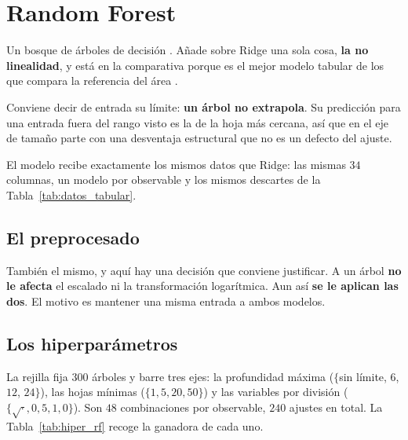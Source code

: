 \section{Random Forest}
\label{sec:sol_rf}

Un bosque de árboles de decisión \cite{breiman2001random}. Añade sobre Ridge una sola cosa,
\textbf{la no linealidad}, y está en la comparativa porque es el mejor modelo tabular de los
que compara la referencia del área \cite{liao2024machine}.

Conviene decir de entrada su límite: \textbf{un árbol no extrapola}. Su predicción para una
entrada fuera del rango visto es la de la hoja más cercana, así que en el eje de tamaño parte
con una desventaja estructural que no es un defecto del ajuste.

El modelo recibe exactamente los mismos datos que Ridge: las mismas $34$ columnas, un modelo por observable y los
mismos descartes de la Tabla~\ref{tab:datos_tabular}.

\subsection*{El preprocesado}

También el mismo, y aquí hay una decisión que conviene justificar. A un árbol \textbf{no le
afecta} el escalado ni la transformación logarítmica. Aun así \textbf{se le aplican las dos}. El
motivo es mantener una misma entrada a ambos modelos.

\subsection*{Los hiperparámetros}

La rejilla fija $300$ árboles y barre tres ejes: la profundidad máxima ($\{$sin límite, $6$,
$12$, $24\}$), las hojas mínimas ($\{1, 5, 20, 50\}$) y las variables por división
($\{\sqrt{\cdot}, 0{,}5, 1{,}0\}$). Son $48$ combinaciones por observable, $240$ ajustes en
total. La Tabla~\ref{tab:hiper_rf} recoge la ganadora de cada uno.

